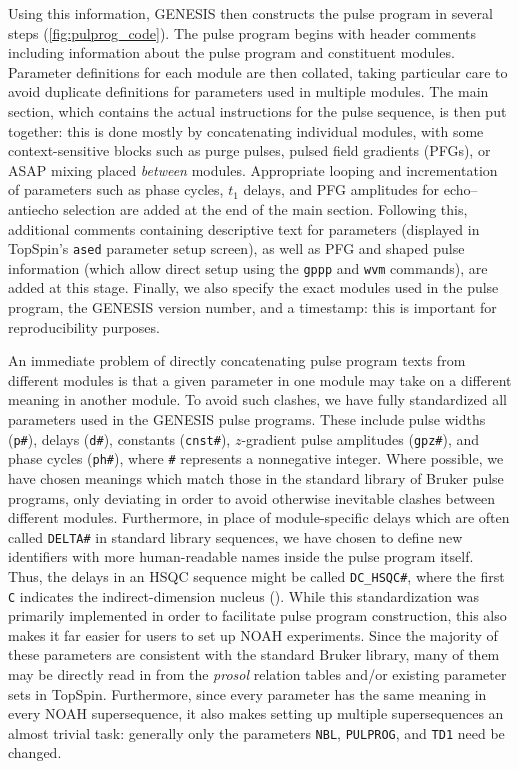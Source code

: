 \documentclass[a4paper,11pt]{article}
\newcommand{\carbon}{\ch{^{13}C}}
\begin{document}
\begin{refsection}
Using this information, GENESIS then constructs the pulse program in several steps (\cref{fig:pulprog_code}).
The pulse program begins with header comments including information about the pulse program and constituent modules.
Parameter definitions for each module are then collated, taking particular care to avoid duplicate definitions for parameters used in multiple modules.
The main section, which contains the actual instructions for the pulse sequence, is then put together: this is done mostly by concatenating individual modules, with some context-sensitive blocks such as purge pulses, pulsed field gradients (PFGs), or ASAP mixing\autocite{Claridge2019MRC} placed \textit{between} modules.
Appropriate looping and incrementation of parameters such as phase cycles, \(t_1\) delays, and PFG amplitudes for echo--antiecho selection are added at the end of the main section.
Following this, additional comments containing descriptive text for parameters (displayed in TopSpin's \texttt{ased} parameter setup screen), as well as PFG and shaped pulse information (which allow direct setup using the \texttt{gppp} and \texttt{wvm} commands), are added at this stage.
Finally, we also specify the exact modules used in the pulse program, the GENESIS version number, and a timestamp: this is important for reproducibility purposes.

An immediate problem of directly concatenating pulse program texts from different modules is that a given parameter in one module may take on a different meaning in another module.
To avoid such clashes, we have fully standardized all parameters used in the GENESIS pulse programs.
These include pulse widths (\texttt{p\#}), delays (\texttt{d\#}), constants (\texttt{cnst\#}), \(z\)-gradient pulse amplitudes (\texttt{gpz\#}), and phase cycles (\texttt{ph\#}), where \texttt{\#} represents a nonnegative integer.
Where possible, we have chosen meanings which match those in the standard library of Bruker pulse programs, only deviating in order to avoid otherwise inevitable clashes between different modules.
Furthermore, in place of module-specific delays which are often called \texttt{DELTA\#} in standard library sequences, we have chosen to define new identifiers with more human-readable names inside the pulse program itself.
Thus, the delays in an HSQC sequence might be called \texttt{DC\_HSQC\#}, where the first \texttt{C} indicates the indirect-dimension nucleus (\carbon{}).
While this standardization was primarily implemented in order to facilitate pulse program construction, this also makes it far easier for users to set up NOAH experiments.
Since the majority of these parameters are consistent with the standard Bruker library, many of them may be directly read in from the \textit{prosol} relation tables and/or existing parameter sets in TopSpin.
Furthermore, since every parameter has the same meaning in every NOAH supersequence, it also makes setting up multiple supersequences an almost trivial task: generally only the parameters \texttt{NBL}, \texttt{PULPROG}, and \texttt{TD1} need be changed.


\end{refsection}
\end{document}
